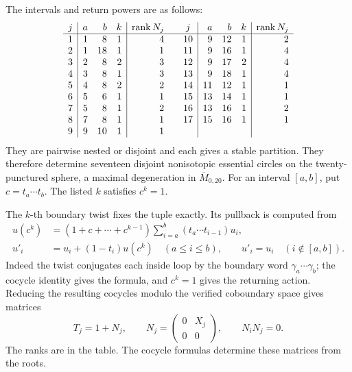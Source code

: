 \documentclass[11pt]{article}
\theoremstyle{definition}
\theoremstyle{remark}
\begin{document}
The intervals and return powers are as follows:
\[
\begin{array}{c|rrr|r@{\qquad}c|rrr|r}
 j&a&b&k&\operatorname{rank}N_j&j&a&b&k&\operatorname{rank}N_j\\\hline
1&1&8&1&4&10&9&12&1&2\\
2&1&18&1&1&11&9&16&1&4\\
3&2&8&2&3&12&9&17&2&4\\
4&3&8&1&3&13&9&18&1&4\\
5&4&8&2&2&14&11&12&1&1\\
6&5&6&1&1&15&13&14&1&1\\
7&5&8&1&2&16&13&16&1&2\\
8&7&8&1&1&17&15&16&1&1\\
9&9&10&1&1&&&&&
\end{array}
\]
They are pairwise nested or disjoint and each gives a stable partition.
They therefore determine seventeen disjoint nonisotopic essential circles
on the twenty-punctured sphere, a maximal degeneration in
\(\overline M_{0,20}\).  For an interval \([a,b]\), put
\(c=t_a\cdots t_b\).  The listed \(k\) satisfies \(c^k=1\).

The \(k\)-th boundary twist fixes the tuple exactly.  Its pullback is computed
from
\[
\begin{split}
 u(c^k)&=(1+c+\cdots+c^{k-1})
             \sum_{i=a}^b(t_a\cdots t_{i-1})u_i,\\
 u'_i&=u_i+(1-t_i)u(c^k)\quad(a\le i\le b),\qquad
 u'_i=u_i\quad(i\notin[a,b]).
\end{split}
\]
Indeed the twist conjugates each inside loop by the boundary word
\(\gamma_a\cdots\gamma_b\); the cocycle identity gives the formula, and
\(c^k=1\) gives the returning action.  Reducing the resulting cocycles
modulo the verified coboundary space gives matrices
\[
 T_j=1+N_j,\qquad N_j=
 \begin{pmatrix}0&X_j\\0&0\end{pmatrix},\qquad
 N_iN_j=0.
\]
The ranks are in the table.  The cocycle formulas determine these matrices from the roots.
\end{document}
